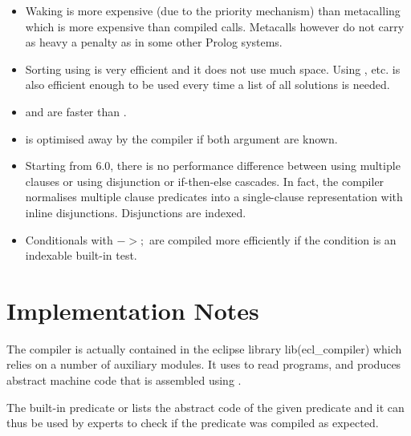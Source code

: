 \begin{itemize}
\item Waking is more expensive (due to the priority mechanism) than metacalling
which is more expensive than compiled calls.
Metacalls however do not carry as heavy a penalty as in 
some other Prolog systems.

\item Sorting using  is very efficient and it does not use
much space.
Using ,  etc. is also efficient enough
to be used every time a list of all solutions is needed.


\item {} and
are faster than .

\item {} is optimised away by the compiler
if both argument are known.

\item Starting from {\eclipse} 6.0, there is no performance difference between
using multiple clauses or using disjunction or if-then-else cascades.
In fact, the compiler normalises multiple clause predicates into
a single-clause representation with inline disjunctions.
Disjunctions are indexed.

\item Conditionals with {\bf $-> ;$} are compiled more efficiently
if the condition is an indexable built-in test.

\end{itemize}


\section{Implementation Notes}

The {\eclipse} compiler is actually contained in the eclipse library
lib(ecl_compiler) which relies on a number of auxiliary modules.
It uses
to read programs, and produces abstract
machine code that is assembled using
.

The built-in predicate 
or 
lists the abstract code of the given predicate and it can thus be used by experts
to check if the predicate was compiled as expected.








